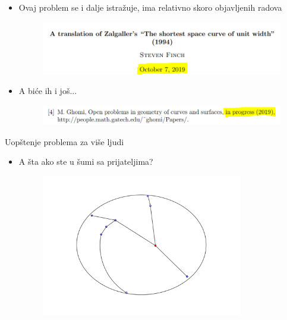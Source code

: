\documentclass[12pt]{beamer}
\theoremstyle{definition}
\theoremstyle{remark}
\theoremstyle{plain}
\begin{document}
\begin{frame}
\begin{itemize}
\item Ovaj problem se i dalje istra\v zuje, ima relativno skoro objavljenih radova
\pause
\begin{figure}
\begin{center}
\includegraphics[width=300pt]{6DANA.png}
\end{center}
\end{figure}

\pause
\item A bi\' ce ih i jo\v s...
\pause 
\begin{figure}
\begin{center}
\includegraphics[width=300pt]{progress.png}
\end{center}
\end{figure}

\end{itemize}
\end{frame}

\begin{frame}{Uop\v stenje problema za vi\v se ljudi}
\begin{itemize}
\item A \v sta ako ste u \v sumi sa prijateljima?
\pause 
\begin{figure}
\begin{center}
\includegraphics[width=250pt]{vise.png}
\end{center}
\end{figure}

\end{itemize}
\end{frame}
\end{document}
